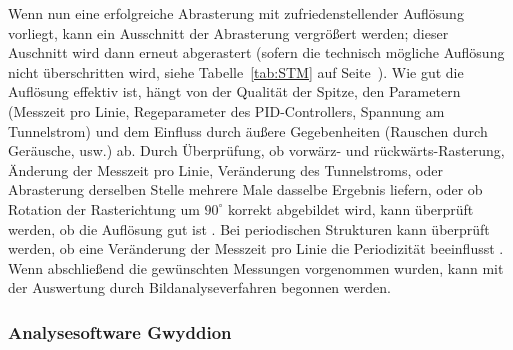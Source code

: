 Wenn nun eine erfolgreiche Abrasterung mit zufriedenstellender
Auflösung vorliegt, kann ein Ausschnitt der Abrasterung
vergrößert werden; dieser Auschnitt wird dann erneut abgerastert
(sofern die technisch mögliche Auflösung nicht überschritten wird,
siehe Tabelle~\ref{tab:STM} auf Seite~\pageref{tab:STM}).
Wie gut die Auflösung effektiv ist, hängt von der Qualität der 
Spitze, den Parametern (Messzeit pro Linie, Regeparameter des
PID-Controllers, Spannung am Tunnelstrom) und dem Einfluss durch
äußere Gegebenheiten (Rauschen durch Geräusche, usw.) ab. 
Durch Überprüfung, ob vorwärz- und rückwärts-Rasterung,
Änderung der Messzeit pro Linie, Veränderung des Tunnelstroms,
oder Abrasterung derselben Stelle mehrere Male  
dasselbe Ergebnis liefern, oder ob Rotation der Rasterichtung
um $90^{\circ}$ korrekt abgebildet wird, kann überprüft werden,
ob die Auflösung gut ist \cite{versuchsanleitung}.
Bei periodischen Strukturen kann überprüft werden, ob eine
Veränderung der Messzeit pro Linie die Periodizität beeinflusst
\cite{versuchsanleitung}. Wenn abschließend die gewünschten
Messungen vorgenommen wurden, kann mit der Auswertung 
durch Bildanalyseverfahren begonnen werden. 
\subsubsection{Analysesoftware Gwyddion}

